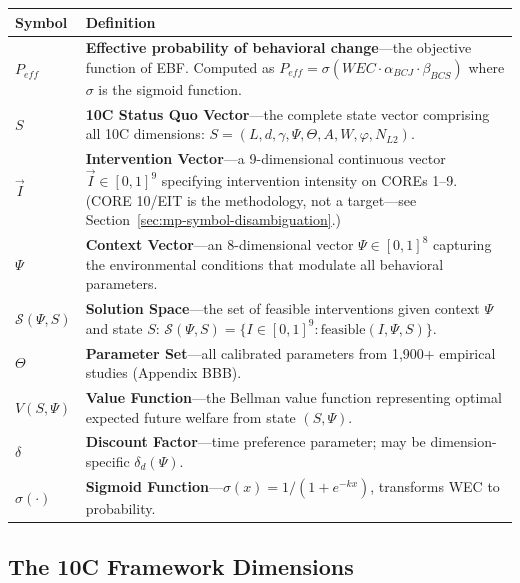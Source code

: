 \begin{longtable}{@{}p{2.8cm}p{10cm}@{}}
\toprule
\textbf{Symbol} & \textbf{Definition} \\
\midrule
\endhead
$P_{eff}$ & \textbf{Effective probability of behavioral change}---the objective function of EBF. Computed as $P_{eff} = \sigma(WEC \cdot \alpha_{BCJ} \cdot \beta_{BCS})$ where $\sigma$ is the sigmoid function. \\[6pt]
$S$ & \textbf{10C Status Quo Vector}---the complete state vector comprising all 10C dimensions: $S = (L, d, \gamma, \Psi, \Theta, A, W, \varphi, N_{L2})$. \\[6pt]
$\vec{I}$ & \textbf{Intervention Vector}---a 9-dimensional continuous vector $\vec{I} \in [0,1]^9$ specifying intervention intensity on COREs 1--9. (CORE 10/EIT is the methodology, not a target---see Section~\ref{sec:mp-symbol-disambiguation}.) \\[6pt]
$\Psi$ & \textbf{Context Vector}---an 8-dimensional vector $\Psi \in [0,1]^8$ capturing the environmental conditions that modulate all behavioral parameters. \\[6pt]
$\mathcal{S}(\Psi, S)$ & \textbf{Solution Space}---the set of feasible interventions given context $\Psi$ and state $S$: $\mathcal{S}(\Psi, S) = \{I \in [0,1]^9 : \text{feasible}(I, \Psi, S)\}$. \\[6pt]
$\Theta$ & \textbf{Parameter Set}---all calibrated parameters from 1,900+ empirical studies (Appendix BBB). \\[6pt]
$V(S, \Psi)$ & \textbf{Value Function}---the Bellman value function representing optimal expected future welfare from state $(S, \Psi)$. \\[6pt]
$\delta$ & \textbf{Discount Factor}---time preference parameter; may be dimension-specific $\delta_d(\Psi)$. \\[6pt]
$\sigma(\cdot)$ & \textbf{Sigmoid Function}---$\sigma(x) = 1/(1+e^{-kx})$, transforms WEC to probability. \\
\bottomrule
\end{longtable}

\subsection{The 10C Framework Dimensions}


